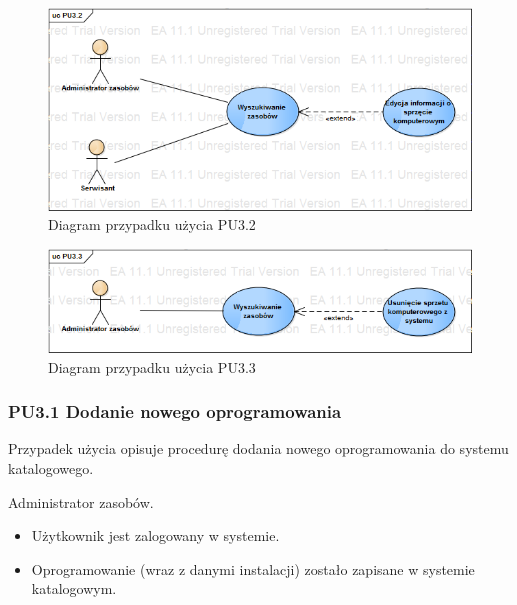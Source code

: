 \begin{figure}[h!]
	\centering
	\includegraphics[scale=0.6]{img/diagrams/useCaseDiagrams/PU3_2.png}
	\caption{Diagram przypadku użycia PU3.2 \label{fig:labelUCPU3.2}}
\end{figure}

\begin{figure}[h!]
	\centering
	\includegraphics[scale=0.6]{img/diagrams/useCaseDiagrams/PU3_3.png}
	\caption{Diagram przypadku użycia PU3.3 \label{fig:labelUCPU3.3}}
\end{figure}

\subsubsection{PU3.1 Dodanie nowego oprogramowania}

Przypadek użycia opisuje procedurę dodania nowego oprogramowania do systemu katalogowego.

Administrator zasobów.

\begin{itemize}
\item Użytkownik jest zalogowany w systemie.
\end{itemize}

\begin{itemize}
\item Oprogramowanie (wraz z danymi instalacji) zostało zapisane w systemie katalogowym.
\end{itemize}

